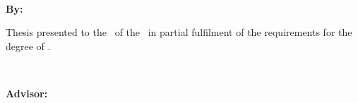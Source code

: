 \begin{titlepage}


	\newlength{\savedheadheight}
	\setlength{\savedheadheight}{\headheight}
	\newlength{\savedtopmargin}
	\setlength{\savedtopmargin}{\topmargin}
	\setlength{\headheight}{60pt}
	\addtolength{\topmargin}{-45pt}

	\thispagestyle{frontpage}

	\begin{center}

		\vspace*{4\baselineskip}


		{\Huge \textbf{\ThesisTitle\\}}%
		\vspace*{1.5\baselineskip}

		\large{\textbf{By: \ThesisAuthor}}\\ %

		\vspace{1.5\baselineskip}

		\large{Thesis presented to the \ThesisFaculty\ of the \ThesisUniversity\ in partial fulfilment of the requirements for the degree of \ThesisDegree.} %

		\vspace{1.5\baselineskip}
		\ThesisMonth\ \ThesisYear\\ %
		\ThesisLocation %
		\vspace{1.5\baselineskip}

		\large{\textbf{Advisor: \ThesisAdvisor}}\\ %

	\end{center}

	\vspace*{4\baselineskip}


	\setlength{\headheight}{\savedheadheight}
	\setlength{\topmargin}{\savedtopmargin}

\end{titlepage}
